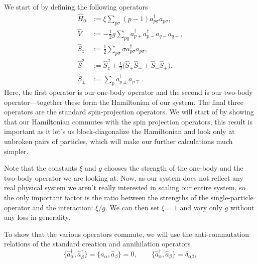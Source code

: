 \documentclass[a4paper, 11pt, notitlepage, english]{article}
\newcommand{\op}[1]{\hat{#1}}
\begin{document}
We start of by defining the following operators
\begin{align*}
  \op{H}_0 &:= \xi \sum_{p \sigma} (p-1)a_{p\sigma}^\dagger a_{p\sigma}, \\
  \op{V} &:= -\frac{1}{2}g \sum_{p q} a_{p+}^\dagger a_{p-}^\dagger a_{q-} a_{q+}, \\
  \op{S}_z &:= \frac{1}{2}\sum_{p\sigma} \sigma a_{p\sigma}^\dagger a_{p\sigma}, \\
  \op{S}^2 &:= \op{S}_z^2 + \frac{1}{2}\big(\op{S}_+\op{S}_- + \op{S}_-\op{S}_+\big), \\
  \op{S}_\pm &:= \sum_p a_{p\pm}^\dagger a_{p\mp}.
\end{align*}
Here, the first operator is our one-body operator and the second is our two-body operator---together these form the Hamiltonian of our system. The final three operators are the standard spin-projection operators. We will start of by showing that our Hamiltonian commutes with the spin projection operators, this result is important as it let's us block-diagonalize the Hamiltonian and look only at unbroken pairs of particles, which will make our further calculations much simpler.

Note that the constants $\xi$ and $g$ chooses the strength of the one-body and the two-body operator we are looking at. Now, as our system does not reflect any real physical system we aren't really interested in scaling our entire system, so the only important factor is the ratio between the strengths of the single-particle operator and the interaction: $\xi/g$. We can then set $\xi=1$ and vary only $g$ without any loss in generality.

To show that the various operators commute, we will use the anti-commutation relations of the standard creation and annihilation operators
$$\{\op{a}_\alpha^\dagger, \op{a}_\beta^\dagger \} = \{\op{a}_\alpha, \op{a}_\beta \} = 0, \qquad \{\op{a}_\alpha^\dagger, \op{a}_\beta \} = \delta_{\alpha\beta},$$
\end{document}
